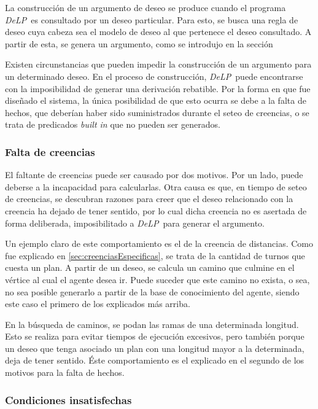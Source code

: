 \documentclass[oneside]{book}
\theoremstyle{definition}
\newcommand{\DLP}{\mbox{\textit{DeLP}}}
\begin{document}
La construcción de un argumento de deseo se produce cuando el programa \DLP\ es 
consultado por un deseo particular. Para esto, se busca una regla de deseo cuya cabeza sea
el modelo de deseo al que pertenece el deseo consultado. A partir de esta, se genera un 
argumento, como se introdujo en la sección %

Existen circunstancias que pueden impedir la construcción de un argumento para un determinado
deseo. En el proceso de construcción, \DLP\ puede encontrarse con la imposibilidad de generar
una derivación rebatible. Por la forma en que fue diseñado el sistema, la única posibilidad de
que esto ocurra se debe a la falta de hechos, que deberían haber sido suministrados durante el
seteo de creencias, o se trata de predicados \textit{built in} que no pueden ser generados. 

\subsubsection{Falta de creencias}

El faltante de creencias puede ser causado por dos motivos. Por un lado, puede 
deberse a la incapacidad para calcularlas. Otra causa es que, en tiempo de seteo de creencias,
se descubran razones para creer que el deseo relacionado con la creencia ha dejado de tener 
sentido, por lo cual dicha creencia no es asertada de forma deliberada, imposibilitado a \DLP\ 
para generar el argumento.

Un ejemplo claro de este comportamiento es el de la creencia de distancias. Como fue explicado en 
\ref{sec:creenciasEspecificas}, se trata de la cantidad de turnos que cuesta un plan. A partir de un
deseo, se calcula un camino que culmine en el vértice al cual el agente desea ir. Puede suceder que 
este camino no exista, o sea, no sea posible generarlo a partir de la base de conocimiento del 
agente, siendo este caso el primero de los explicados más arriba. 

En la búsqueda de caminos, se podan las ramas de una determinada longitud. Esto se realiza para evitar
tiempos de ejecución excesivos, pero también porque un deseo que tenga asociado un plan con una 
longitud mayor a la determinada, deja de tener sentido. Éste comportamiento es el explicado en el 
segundo de los motivos para la falta de hechos.

\subsubsection{Condiciones insatisfechas}
\end{document}
